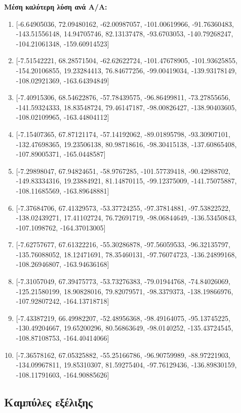 \documentclass[12pt,a4paper]{article}
\begin{document}
\textbf{Μέση καλύτερη λύση ανά Α/Α:}
\begin{enumerate}
    \item {[-6.64905036, 72.09480162, -62.00987057, -101.00619966, -91.76360483, -143.51556148, 14.94705746, 82.13137478, -93.6703053, -140.79268247, -104.21061348, -159.60914523]}
    \item {[-7.51542221, 68.28571504, -62.62622724, -101.47678905, -101.93625855, -154.20106855, 19.23284413, 76.84677256, -99.00419034, -139.93178149, -108.02921369, -163.64394849]}
    \item {[-7.40915306, 68.54622876, -57.78439575, -96.86499811, -73.27855656, -141.59324333, 18.83548724, 79.46147187, -98.00826427, -138.90403605, -108.02109965, -163.44804112]}
    \item {[-7.15407365, 67.87121174, -57.14192062, -89.01895798, -93.30907101, -132.47698365, 19.23506138, 80.98718616, -98.30415138, -137.60865408, -107.89005371, -165.0448587]}
    \item {[-7.29898047, 67.94824651, -58.9767285, -101.57739418, -90.42988702, -149.83334316, 19.23884921, 81.14870115, -99.12375009, -141.75075887, -108.11685569, -163.89648881]}
    \item {[-7.37684706, 67.41329573, -53.37724255, -97.37814881, -97.53822522, -138.02439271, 17.41102724, 76.72691719, -98.06844649, -136.53450843, -107.1098762, -164.37013005]}
    \item {[-7.62757677, 67.61322216, -55.30286878, -97.56059533, -96.32135797, -135.76088052, 18.12471691, 78.35460131, -97.76074723, -136.24899168, -108.26946807, -163.94636168]}
    \item {[-7.31057049, 67.39475773, -53.73276383, -79.01944768, -74.84026069, -125.21580199, 18.90828016, 79.82079571, -98.3379373, -138.19866976, -107.92807242, -164.13718718]}
    \item {[-7.43387219, 66.49982207, -52.48956368, -98.49164075, -95.13745225, -130.49204667, 19.65200296, 80.56863649, -98.0140252, -135.43724545, -108.87108753, -164.40414066]}
    \item {[-7.36578162, 67.05325882, -55.25166786, -96.90759989, -88.97221903, -134.09967811, 19.85310307, 81.59275404, -97.76129436, -136.89830159, -108.11791603, -164.90885626]}
\end{enumerate}

\subsection{Καμπύλες εξέλιξης}
\end{document}
